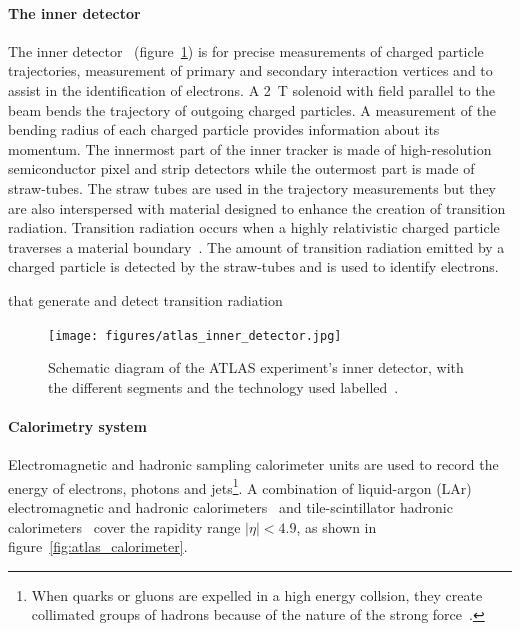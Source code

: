 \paragraph*{The inner detector} \hfill \break
The inner detector~\cite{atlas_inner_detector_tdr_1, atlas_inner_detector_tdr_2} (figure~\ref{fig:atlas_inner_detector}) is for precise measurements of charged particle trajectories, measurement of primary and secondary interaction vertices and to assist in the identification of electrons. A \SI{2}{\tesla} solenoid with field parallel to the beam bends the trajectory of outgoing charged particles. A measurement of the bending radius of each charged particle provides information about its momentum. The innermost part of the inner tracker is made of high-resolution semiconductor pixel and strip detectors while the outermost part is made of straw-tubes. The straw tubes are used in the trajectory measurements but they are also interspersed with material designed to enhance the creation of transition radiation. Transition radiation occurs when a highly relativistic charged particle traverses a material boundary~\cite{grupen_particle_2008}. The amount of transition radiation emitted by a charged particle is detected by the straw-tubes and is used to identify electrons. 

 that generate and detect transition radiation

\begin{figure}
    \centering
    \texttt{[image: figures/atlas\_inner\_detector.jpg]}
    \caption{Schematic diagram of the ATLAS experiment's inner detector, with the different segments and the technology used labelled~\cite{collaboration_atlas_2008}.}
    \label{fig:atlas_inner_detector}
\end{figure}

\paragraph*{Calorimetry system} \hfill \break
Electromagnetic and hadronic sampling calorimeter units are used to record the energy of electrons, photons and jets\footnote{When quarks or gluons are expelled in a high energy collsion, they create collimated groups of hadrons because of the nature of the strong force~\cite{grupen_particle_2008}.}. A combination of liquid-argon (LAr) electromagnetic and hadronic calorimeters~\cite{atlas_lar_cal_tdr} and tile-scintillator hadronic calorimeters~\cite{atlas_tile_cal_tdr} cover the rapidity range $|\eta| < 4.9$, as shown in figure~\ref{fig:atlas_calorimeter}.


